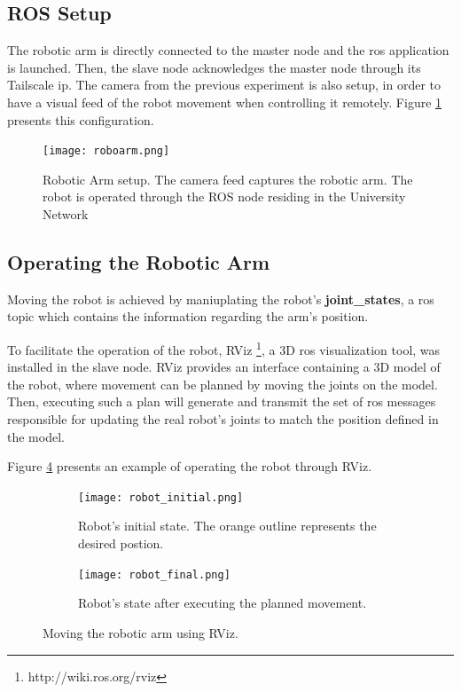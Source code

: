 \documentclass[11pt,twoside,a4paper]{report}
\begin{document}
\subsection{ROS Setup}

The robotic arm is directly connected to the master node and the \ac{ros} application is launched. Then, the slave node acknowledges the master node through its Tailscale \ac{ip}. The camera from the previous experiment is also setup, in order to have a visual feed of the robot movement when controlling it remotely. Figure \ref{fig:roboarm} presents this configuration.

\begin{figure}[h]
\centering
  \texttt{[image: roboarm.png]}
  \caption{Robotic Arm setup. The camera feed captures the robotic arm. The robot is operated through the ROS node residing in the University Network}
  \label{fig:roboarm}
\end{figure}

\subsection{Operating the Robotic Arm}

Moving the robot is achieved by maniuplating the robot's \textbf{joint\_states}, a \ac{ros} topic which contains the information regarding the arm's position.

To facilitate the operation of the robot, RViz \footnote{http://wiki.ros.org/rviz}, a 3D \ac{ros} visualization tool, was installed in the slave node. RViz provides an interface containing a 3D model of the robot, where movement can be planned by moving the joints on the model. Then, executing such a plan will generate and transmit the set of \ac{ros} messages responsible for updating the real robot's joints to match the position defined in the model.

Figure \ref{fig:armoperation} presents an example of operating the robot through RViz.

\begin{figure}[h!]
    \centering
    \begin{subfigure}[b]{0.45\textwidth}
        \centering
        \texttt{[image: robot\_initial.png]}
        \caption{Robot's initial state. The orange outline represents the desired postion.}
        \label{fig:image1}
    \end{subfigure}
    \hfill
    \begin{subfigure}[b]{0.45\textwidth}
        \centering
        \texttt{[image: robot\_final.png]}
        \caption{Robot's state after executing the planned movement.}
        \label{fig:image2}
    \end{subfigure}
    \caption{Moving the robotic arm using RViz.}
    \label{fig:armoperation}
\end{figure}
\end{document}
